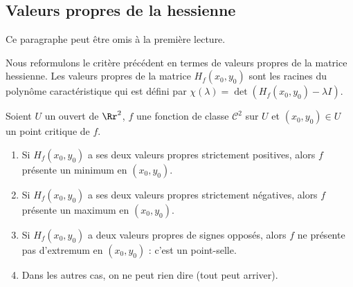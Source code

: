 \documentclass[11pt, class=report,crop=false]{standalone}
\begin{document}
\subsection{Valeurs propres de la hessienne}

Ce paragraphe peut être omis à la première lecture.

Nous reformulons le critère précédent en termes de valeurs propres de la matrice hessienne.
Les valeurs propres de la matrice $H_f(x_0,y_0)$ sont les racines du polynôme caractéristique qui est défini par $\chi(\lambda)=\det \left( H_f(x_0,y_0)-\lambda I \right)$.

\begin{theoreme}
Soient $U$ un ouvert de $\Rr^2$, $f$ une fonction de classe $\mathcal{C}^2$ sur $U$ et $(x_0,y_0)\in U$ un point critique de $f$.
\begin{enumerate}
    \item Si $H_f(x_0,y_0)$ a ses deux valeurs propres strictement positives, alors $f$ présente un minimum en $(x_0,y_0)$.
    \item Si $H_f(x_0,y_0)$ a ses deux valeurs propres strictement négatives, alors $f$ présente un maximum en $(x_0,y_0)$.
    \item Si $H_f(x_0,y_0)$ a deux valeurs propres de signes opposés, alors $f$ ne présente pas d'extremum en $(x_0,y_0)$ : c'est un point-selle.
    \item Dans les autres cas, on ne peut rien dire (tout peut arriver).
\end{enumerate}
\end{theoreme}
\end{document}
